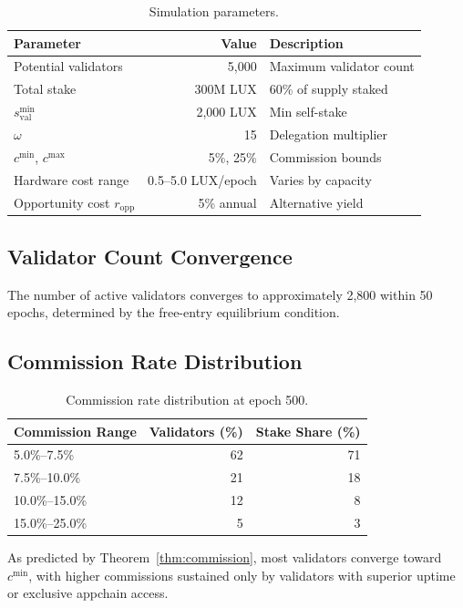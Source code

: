 \documentclass[11pt,a4paper]{article}
\begin{document}
\begin{table}[H]
\centering
\caption{Simulation parameters.}
\label{tab:simparams}
\begin{tabular}{lrl}
\toprule
\textbf{Parameter} & \textbf{Value} & \textbf{Description} \\
\midrule
Potential validators & 5,000 & Maximum validator count \\
Total stake & 300M LUX & 60\% of supply staked \\
$s^{\min}_{\text{val}}$ & 2,000 LUX & Min self-stake \\
$\omega$ & 15 & Delegation multiplier \\
$c^{\min}$, $c^{\max}$ & 5\%, 25\% & Commission bounds \\
Hardware cost range & 0.5--5.0 LUX/epoch & Varies by capacity \\
Opportunity cost $r_{\text{opp}}$ & 5\% annual & Alternative yield \\
\bottomrule
\end{tabular}
\end{table}

\subsection{Validator Count Convergence}

The number of active validators converges to approximately 2,800 within 50 epochs, determined by the free-entry equilibrium condition.

\subsection{Commission Rate Distribution}

\begin{table}[H]
\centering
\caption{Commission rate distribution at epoch 500.}
\label{tab:commission_dist}
\begin{tabular}{lrr}
\toprule
\textbf{Commission Range} & \textbf{Validators (\%)} & \textbf{Stake Share (\%)} \\
\midrule
5.0\%--7.5\% & 62 & 71 \\
7.5\%--10.0\% & 21 & 18 \\
10.0\%--15.0\% & 12 & 8 \\
15.0\%--25.0\% & 5 & 3 \\
\bottomrule
\end{tabular}
\end{table}

As predicted by Theorem~\ref{thm:commission}, most validators converge toward $c^{\min}$, with higher commissions sustained only by validators with superior uptime or exclusive appchain access.
\end{document}
